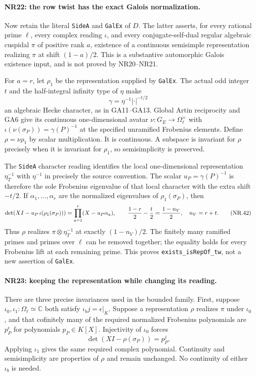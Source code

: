 \paragraph{NR22: the row twist has the exact Galois normalization.}
Now retain the literal \texttt{SideA} and \texttt{GalEx} of $D$.
The latter asserts, for every rational prime $\ell$, every complex
reading $\iota$, and every conjugate-self-dual regular algebraic
cuspidal $\pi$ of positive rank $a$, existence of a continuous
semisimple representation realizing $\pi$ at shift $(1-a)/2$.
This is a substantive automorphic Galois existence input, and
is not proved by NR20--NR21.

For $a=r$, let $\rho_1$ be the representation supplied by
\texttt{GalEx}. The actual odd integer $t$ and the half-integral
infinity type of $\eta$ make
\[
                     \gamma=\eta^{-1}|\cdot|^{-t/2}   \tag{NR.41}
\]
an algebraic Hecke character, as in GA11--GA13. Global Artin
reciprocity and GA6 give its continuous one-dimensional avatar
$\nu:G_E\to\Omega_\ell^\times$ with
$\iota(\nu(\sigma_P))=\gamma(P)^{-1}$ at the specified unramified
Frobenius elements. Define $\rho=\nu\rho_1$ by scalar multiplication.
It is continuous. A subspace is invariant for $\rho$ precisely
when it is invariant for $\rho_1$, so semisimplicity is preserved.

The \texttt{SideA} character reading identifies the local
one-dimensional representation $\eta_T^{-1}$ with $\eta^{-1}$
in precisely the source convention. The scalar
$u_P=\gamma(P)^{-1}$ is therefore the sole Frobenius eigenvalue
of that local character with the extra shift $-t/2$. If
$\alpha_1,\ldots,\alpha_r$ are the normalized eigenvalues of
$\rho_1(\sigma_P)$, then
\[
 \det(XI-u_P\,\iota(\rho_1(\sigma_P)))
                              =\prod_{a=1}^r(X-u_P\alpha_a),
 \qquad {1-r\over2}-{t\over2}={1-n_V\over2},
                          \quad n_V=r+t.              \tag{NR.42}
\]
Thus $\rho$ realizes $\pi\otimes\eta_T^{-1}$ at exactly
$(1-n_V)/2$. The finitely many ramified primes and primes over
$\ell$ can be removed together; the equality holds for every
Frobenius lift at each remaining prime. This proves
\texttt{exists\_isRepOf\_tw}, not a new assertion of \texttt{GalEx}.

\paragraph{NR23: keeping the representation while changing its reading.}
There are three precise invariances used in the bounded family.
First, suppose $\iota_0,\iota_1:\Omega_\ell\simeq\mathbb C$
both satisfy $\iota_bj=\epsilon|_K$. Suppose a representation
$\rho$ realizes $\pi$ under $\iota_0$, and that cofinitely many
of the required normalized Frobenius polynomials are
$p_P^\epsilon$ for polynomials $p_P\in K[X]$. Injectivity of
$\iota_0$ forces
\[
                \det(XI-\rho(\sigma_P))=p_P^j.
                                                               \tag{NR.43}
\]
Applying $\iota_1$ gives the same required complex polynomial.
Continuity and semisimplicity are properties of $\rho$ and
remain unchanged. No continuity of either $\iota_b$ is needed.

